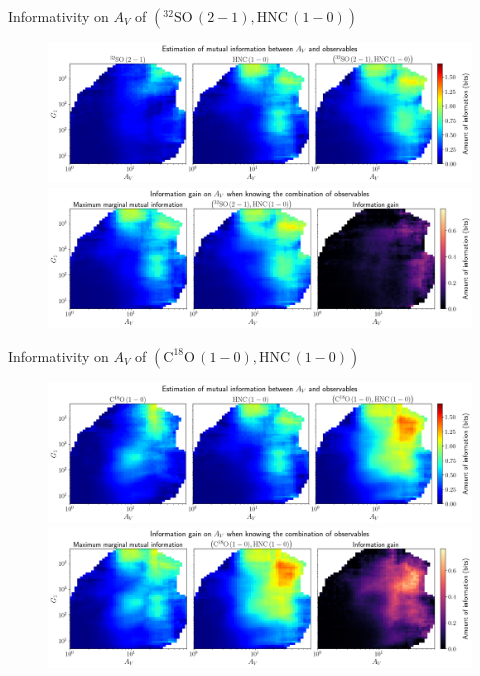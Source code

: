 \documentclass{beamer}
\begin{document}
\begin{frame}{Informativity on $A_V$ of $\left(\mathrm{^{32}SO\,(2-1)},\mathrm{HNC\,(1-0)}\right)$}
    \begin{figure}
        \centering
        \includegraphics[width=0.95\linewidth]{../mi/av__32so21_hnc10_mi.png}
        \vfill
        \includegraphics[width=0.95\linewidth]{../mi/av__32so21_hnc10_mi_gain.png}
    \end{figure}
\end{frame}

\begin{frame}{Informativity on $A_V$ of $\left(\mathrm{C^{18}O\,(1-0)},\mathrm{HNC\,(1-0)}\right)$}
    \begin{figure}
        \centering
        \includegraphics[width=0.95\linewidth]{../mi/av__c18o10_hnc10_mi.png}
        \vfill
        \includegraphics[width=0.95\linewidth]{../mi/av__c18o10_hnc10_mi_gain.png}
    \end{figure}
\end{frame}
\end{document}
